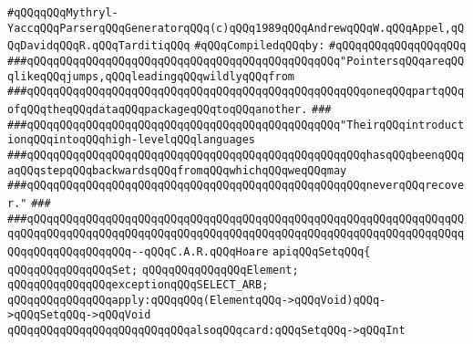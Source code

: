 \label{src/app/yacc/src/utils.api}
\verb|#qQQqqQQqMythryl-YaccqQQqParserqQQqGeneratorqQQq(c)qQQq1989qQQqAndrewqQQqW.qQQqAppel,qQQqDavidqQQqR.qQQqTarditiqQQq|\newline
\newline
\verb|#qQQqCompiledqQQqby:|\newline
\verb|#qQQqqQQqqQQqqQQqqQQq|\newline
\newline
\newline
\newline
\verb|###qQQqqQQqqQQqqQQqqQQqqQQqqQQqqQQqqQQqqQQqqQQqqQQq"PointersqQQqareqQQqlikeqQQqjumps,qQQqleadingqQQqwildlyqQQqfrom|\newline
\verb|###qQQqqQQqqQQqqQQqqQQqqQQqqQQqqQQqqQQqqQQqqQQqqQQqqQQqoneqQQqpartqQQqofqQQqtheqQQqdataqQQqpackageqQQqtoqQQqanother.|\newline
\verb|###|\newline
\verb|###qQQqqQQqqQQqqQQqqQQqqQQqqQQqqQQqqQQqqQQqqQQqqQQq"TheirqQQqintroductionqQQqintoqQQqhigh-levelqQQqlanguages|\newline
\verb|###qQQqqQQqqQQqqQQqqQQqqQQqqQQqqQQqqQQqqQQqqQQqqQQqqQQqhasqQQqbeenqQQqaqQQqstepqQQqbackwardsqQQqfromqQQqwhichqQQqweqQQqmay|\newline
\verb|###qQQqqQQqqQQqqQQqqQQqqQQqqQQqqQQqqQQqqQQqqQQqqQQqqQQqneverqQQqrecover."|\newline
\verb|###|\newline
\verb|###qQQqqQQqqQQqqQQqqQQqqQQqqQQqqQQqqQQqqQQqqQQqqQQqqQQqqQQqqQQqqQQqqQQqqQQqqQQqqQQqqQQqqQQqqQQqqQQqqQQqqQQqqQQqqQQqqQQqqQQqqQQqqQQqqQQqqQQqqQQqqQQqqQQqqQQqqQQq--qQQqC.A.R.qQQqHoare|\newline
\newline
\newline
\newline
\verb|apiqQQqSetqQQq{|\newline
\newline
\verb|qQQqqQQqqQQqqQQqSet;|\newline
\verb|qQQqqQQqqQQqqQQqElement;|\newline
\newline
\verb|qQQqqQQqqQQqqQQqexceptionqQQqSELECT_ARB;|\newline
\newline
\verb|qQQqqQQqqQQqqQQqapply:qQQqqQQq(ElementqQQq->qQQqVoid)qQQq->qQQqSetqQQq->qQQqVoid|\newline
\verb|qQQqqQQqqQQqqQQqqQQqqQQqqQQqalsoqQQqcard:qQQqSetqQQq->qQQqInt|\newline
